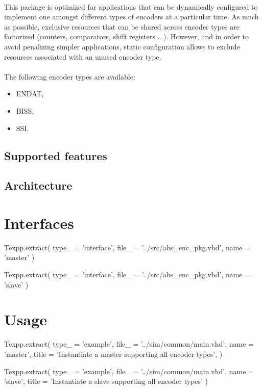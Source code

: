 \documentclass[12pt]{article}
\begin{document}
\paragraph{}
This package is optimized for applications that can be dynamically configured
to implement one amongst different types of encoders at a particular time. As
much as possible, exclusive resources that can be shared across encoder types
are factorized (counters, comparators, shift registers ...). However, and in
order to avoid penalizing simpler applications, static configuration allows to
exclude resources associated with an unused encoder type.

\paragraph{}
The following encoder types are available:
\begin{itemize}
 \item ENDAT,
 \item BISS,
 \item SSI.
\end{itemize}

\subsection{Supported features}
\todo

\subsection{Architecture}
\todo



\newpage
\section{Interfaces}

\begin{texpp}
Texpp.extract(
type_ = 'interface',
file_ = '../src/abs_enc_pkg.vhd',
name = 'master'
)
\end{texpp}

\begin{texpp}
Texpp.extract(
type_ = 'interface',
file_ = '../src/abs_enc_pkg.vhd',
name = 'slave'
)
\end{texpp}


\newpage
\section{Usage}

\begin{texpp}
Texpp.extract(
type_ = 'example',
file_ = '../sim/common/main.vhd',
name = 'master',
title = 'Instantiate a master supporting all encoder types',
)
\end{texpp}

\begin{texpp}
Texpp.extract(
type_ = 'example',
file_ = '../sim/common/main.vhd',
name = 'slave',
title = 'Instantiate a slave supporting all encoder types'
)
\end{texpp}
\end{document}
